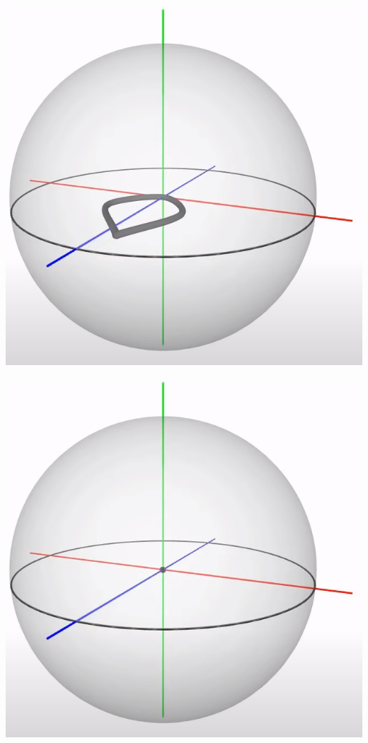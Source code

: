 \documentclass[10pt]{beamer}
\begin{document}
    \includegraphics[scale=0.1]{Pictures/4pisphere3.png}

    \includegraphics[scale=0.1]{Pictures/4pisphere4.png}
\end{document}
